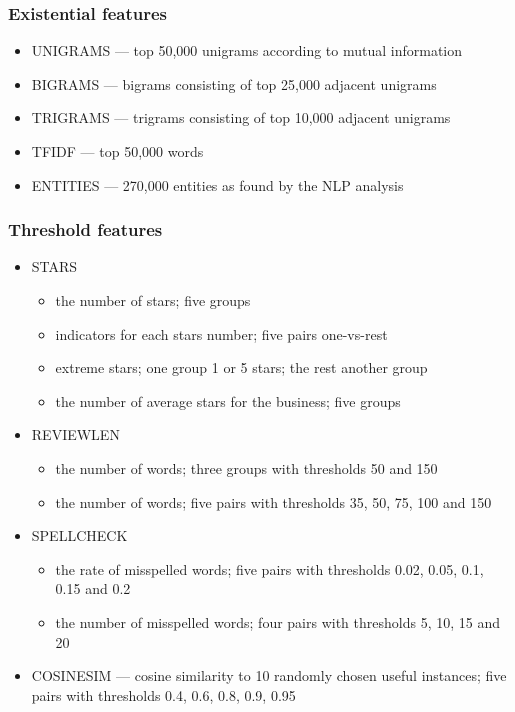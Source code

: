 \subsubsection*{Existential features}

\begin{itemize}
	\item UNIGRAMS --- top 50,000 unigrams according to mutual information
	\item BIGRAMS --- bigrams consisting of top 25,000 adjacent unigrams
	\item TRIGRAMS  --- trigrams consisting of top 10,000 adjacent unigrams
	\item TFIDF  --- top 50,000 words
	\item ENTITIES --- 270,000 entities as found by the NLP analysis
\end{itemize}

\subsubsection*{Threshold features}

\begin{itemize}
	\item STARS 
		\begin{itemize}
			\item the number of stars; five groups
			\item indicators for each stars number; five pairs one-vs-rest
			\item extreme stars; one group 1 or 5 stars; the rest another group
			\item the number of average stars for the business; five groups
		\end{itemize}
	\item REVIEWLEN 
		\begin{itemize}
			\item the number of words; three groups with thresholds 50 and 150
			\item the number of words; five pairs with thresholds 35, 50, 75, 100 and 150
		\end{itemize}
	\item SPELLCHECK 
		\begin{itemize}
			\item the rate of misspelled words; five pairs with thresholds 0.02, 0.05, 0.1, 0.15 and 0.2
			\item the number of misspelled words; four pairs with thresholds 5, 10, 15 and 20
		\end{itemize}
	
	\item COSINESIM --- cosine similarity to 10 randomly chosen useful instances; five pairs with thresholds 0.4, 0.6, 0.8, 0.9, 0.95
\end{itemize}

